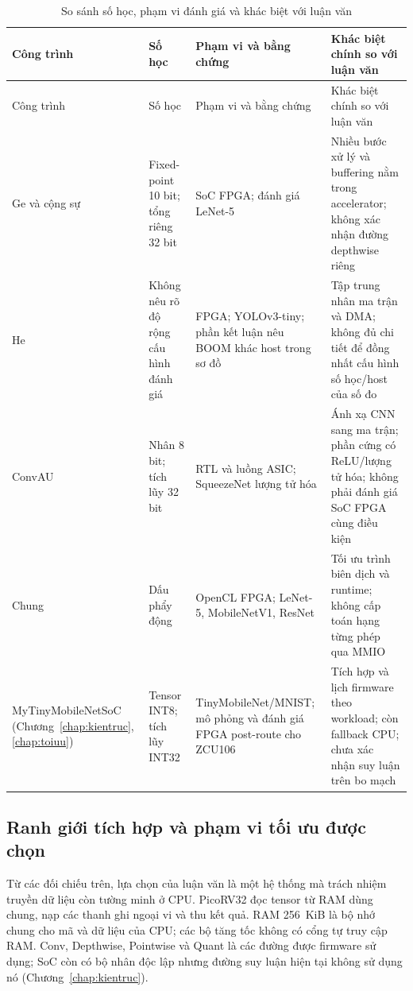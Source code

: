 \begingroup
\small
\setlength{\tabcolsep}{4pt}
\renewcommand{\arraystretch}{1.12}
\begin{longtable}{@{}>{\raggedright\arraybackslash}p{}>{\raggedright\arraybackslash}p{}>{\raggedright\arraybackslash}p{}>{\raggedright\arraybackslash}p{}@{}}
\caption{So sánh số học, phạm vi đánh giá và khác biệt với luận văn}\label{tab:related-scope}\\
\toprule
Công trình & Số học & Phạm vi và bằng chứng & Khác biệt chính so với luận văn \\
\midrule
\endfirsthead
\toprule
Công trình & Số học & Phạm vi và bằng chứng & Khác biệt chính so với luận văn \\
\midrule
\endhead
\bottomrule
\endfoot
Ge và cộng sự~\cite{ge2019compact} & Fixed-point 10 bit; tổng riêng 32 bit & SoC FPGA; đánh giá LeNet-5 & Nhiều bước xử lý và buffering nằm trong accelerator; không xác nhận đường depthwise riêng \\
\midrule
He~\cite{he2021design} & Không nêu rõ độ rộng cấu hình đánh giá & FPGA; YOLOv3-tiny; phần kết luận nêu BOOM khác host trong sơ đồ & Tập trung nhân ma trận và DMA; không đủ chi tiết để đồng nhất cấu hình số học/host của số đo \\
\midrule
ConvAU~\cite{kiningham2016design} & Nhân 8 bit; tích lũy 32 bit & RTL và luồng ASIC; SqueezeNet lượng tử hóa & Ánh xạ CNN sang ma trận; phần cứng có ReLU/lượng tử hóa; không phải đánh giá SoC FPGA cùng điều kiện \\
\midrule
Chung~\cite{chung2021optimization} & Dấu phẩy động & OpenCL FPGA; LeNet-5, MobileNetV1, ResNet & Tối ưu trình biên dịch và runtime; không cấp toán hạng từng phép qua MMIO \\
\midrule
MyTiny\-Mobile\-NetSoC (Chương~\ref{chap:kientruc}, \ref{chap:toiuu}) & Tensor INT8; tích lũy INT32 & TinyMobileNet/MNIST; mô phỏng và đánh giá FPGA post-route cho ZCU106 & Tích hợp và lịch firmware theo workload; còn fallback CPU; chưa xác nhận suy luận trên bo mạch \\
\end{longtable}
\endgroup

\subsection{Ranh giới tích hợp và phạm vi tối ưu được chọn}
Từ các đối chiếu trên, lựa chọn của luận văn là một hệ thống mà trách nhiệm truyền dữ liệu còn tường minh ở CPU. PicoRV32 đọc tensor từ RAM dùng chung, nạp các thanh ghi ngoại vi và thu kết quả. RAM 256~KiB là bộ nhớ chung cho mã và dữ liệu của CPU; các bộ tăng tốc không có cổng tự truy cập RAM. Conv, Depthwise, Pointwise và Quant là các đường được firmware sử dụng; SoC còn có bộ nhân độc lập nhưng đường suy luận hiện tại không sử dụng nó (Chương~\ref{chap:kientruc}).

